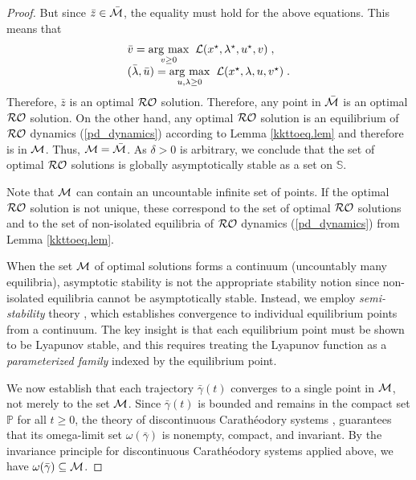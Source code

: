\documentclass[journal,twoside,web]{ieeecolor}
\newcommand{\rev}[1]{\textcolor{revisionblue}{#1}}
\newcommand{\argmax}[1]{\underset{#1}{\operatorname{arg}\,\operatorname{max}}\;}
\begin{document}
\begin{proof}
But since $\bar{z}\in \bar {\cal M}$, the equality must hold for the above equations. This means that
\begin{align*}
\begin{array}{l}
\bar{v}=\argmax{v \geq 0}\; {\cal L}(x^\star,\lambda^\star,u^\star,v)\;,\\
(\bar{\lambda},\bar{u})=\argmax{u,\lambda \geq 0}\; {\cal L}(x^\star,\lambda,u,v^\star)\;.
\end{array}
\end{align*}
Therefore, ${\bar{z}}$ is an optimal ${\cal RO}$ solution. Therefore, any point in $\bar{{\cal M}}$ is an optimal ${\cal RO}$ solution. On the other hand, any optimal ${\cal RO}$ solution is an equilibrium of ${\cal RO}$ dynamics (\ref{pd_dynamics}) according to Lemma \ref{kkttoeq.lem} and therefore is in ${\cal M}$. Thus, ${\cal M}=\bar{\cal M}$. As $\delta>0$ is arbitrary, we conclude that the set of optimal ${\cal RO}$ solutions is globally asymptotically stable as a set on $\mathbb S$.

Note that ${\cal M}$ can contain an uncountable infinite set of points. If the optimal ${\cal RO}$ solution is not unique, these correspond to the set of optimal ${\cal RO}$ solutions and to the set of non-isolated equilibria of ${\cal RO}$ dynamics (\ref{pd_dynamics}) from Lemma \ref{kkttoeq.lem}.

\rev{When the set ${\cal M}$ of optimal solutions forms a continuum (uncountably many equilibria), asymptotic stability is not the appropriate stability notion since non-isolated equilibria cannot be asymptotically stable. Instead, we employ \textit{semi-stability} theory \cite{haddad2009semistability}, which establishes convergence to individual equilibrium points from a continuum. The key insight is that each equilibrium point must be shown to be Lyapunov stable, and this requires treating the Lyapunov function as a \textit{parameterized family} indexed by the equilibrium point.}

\rev{We now establish that each trajectory $\bar{\gamma}(t)$ converges to a single point in ${\cal M}$, not merely to the set ${\cal M}$. Since $\bar{\gamma}(t)$ is bounded and remains in the compact set $\mathbb P$ for all $t \geq 0$, the theory of discontinuous Carath\'{e}odory systems \cite[Proposition~3]{bacciotti2006nonpathological}, \cite[Lemma~4.4]{cherukuri2016} guarantees that its omega-limit set $\omega(\bar{\gamma})$ is nonempty, compact, and invariant. By the invariance principle for discontinuous Carathéodory systems applied above, we have $\omega(\bar{\gamma}) \subseteq {\cal M}$.}


\end{proof}
\end{document}
